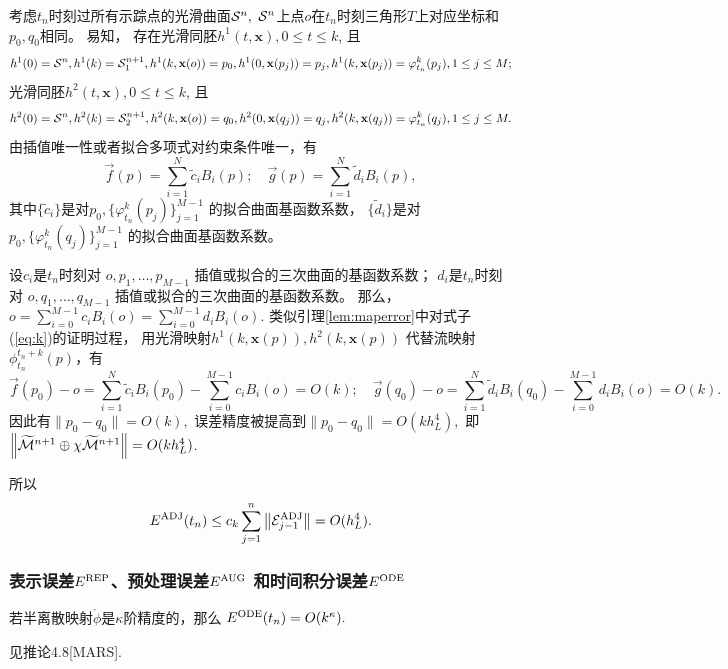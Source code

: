 \begin{pro}
  考虑$t_n$时刻过所有示踪点的光滑曲面${\cal S}^n,$
  ${\cal S}^n$上点$o$在$t_n$时刻三角形$T$上对应坐标和$p_0,q_0$相同。
  易知，
  存在光滑同胚$h^1(t,\mathbf{x}),0\leq t\leq k$, 且
  \begin{displaymath}
  h^1(0)={\cal S}^{n},h^1(k)={\cal S}_1^{n+1},
  h^1(k,\mathbf{x}(o))=p_0, h^1(0,\mathbf{x}(p_j))=p_j,
  h^1(k,\mathbf{x}(p_j))=\varphi^k_{t_n}(p_j),1\leq j\leq M;
\end{displaymath}
 光滑同胚$h^2(t,\mathbf{x}),0\leq t\leq k$, 且
  \begin{displaymath}
  h^2(0)={\cal S}^{n},h^2(k)={\cal S}_2^{n+1},
  h^2(k,\mathbf{x}(o))=q_0, h^2(0,\mathbf{x}(q_j))=q_j,
  h^2(k,\mathbf{x}(q_j))=\varphi^k_{t_n}(q_j),1\leq j\leq M.
\end{displaymath}
由插值唯一性或者拟合多项式对约束条件唯一，有
\begin{displaymath}
  \vec{f}(p)=\sum_{i=1}^{N}\tilde{c}_iB_i(p);\quad
  \vec{g}(p)=\sum_{i=1}^{N}\tilde{d}_iB_i(p),
\end{displaymath}
其中$\{\tilde{c}_i\}$是对$p_0,\{\varphi^k_{t_n}(p_j)\}_{j=1}^{M-1}$
的拟合曲面基函数系数，
$\{\tilde{d}_i\}$是对$p_0,\{\varphi^k_{t_n}(q_j)\}_{j=1}^{M-1}$
的拟合曲面基函数系数。

 设$c_i$是$t_n$时刻对
  $o,p_1,\ldots,p_{M-1}$
  插值或拟合的三次曲面的基函数系数；
  $d_i$是$t_n$时刻对
  $o,q_1,\ldots,q_{M-1}$
  插值或拟合的三次曲面的基函数系数。
  那么，$o=\sum_{i=0}^{M-1}c_iB_i(o)=\sum_{i=0}^{M-1}d_iB_i(o).$
  类似引理\ref{lem:maperror}中对式子(\ref{eq:k})的证明过程，
  用光滑映射$h^1(k,\mathbf{x}(p)),h^2(k,\mathbf{x}(p))$
  代替流映射$\phi_{t_n}^{t_n+k}(p)$，有
  \begin{displaymath}
    \vec{f}(p_0)-o=\sum_{i=1}^{N}\tilde{c}_iB_i(p_0)
    -\sum_{i=0}^{M-1}c_iB_i(o)=O(k);
    \quad \vec{g}(q_0)-o=\sum_{i=1}^{N}\tilde{d}_iB_i(q_0)
   -\sum_{i=0}^{M-1}d_iB_i(o) =O(k).
  \end{displaymath}
  因此有$\lVert p_0-q_0\rVert=O(k),$
  误差精度被提高到$\lVert p_0-q_0\rVert=O(kh_L^4),$
  即$\left\lVert\widetilde{{\cal M}}^{n+1}\oplus \chi
    \widetilde{{\cal M}}^{n+1}\right\rVert=O(kh_L^4)$.

所以
\begin{equation}
  E^{\textmd{ADJ}}(t_n)\leq c_k\sum_{j=1}^{n}\left\lVert
    {\cal E}^\textmd{ADJ}_{j-1}\right \rVert=O(h_L^4).
\end{equation}
\end{pro}


\subsubsection{表示误差$E^\textmd{REP}$、预处理误差$E^\textmd{AUG}$
  和时间积分误差$E^\textmd{ODE}$}
\label{sec:rep,aug,ode}
\begin{prop}
  若半离散映射$\mathring{\phi}$是$\kappa$阶精度的，那么
  $E^{\textmd{ODE}}(t_n)=O(k^\kappa).$
\end{prop}
\begin{pro}
  见推论4.8[MARS]\cite{zhang2016mars}.
\end{pro}

